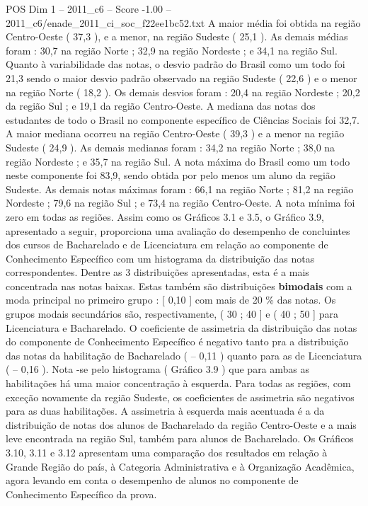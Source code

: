 \begin{textsample}{POS Dim 1 – 2011\_c6 – Score -1.00 – 2011\_c6/enade\_2011\_ci\_soc\_f22ee1bc52.txt}
A maior média foi obtida na região Centro-Oeste ( 37,3 ), e a menor, na região Sudeste ( 25,1 ).
As demais médias foram : 30,7 na região Norte ; 32,9 na região Nordeste ; e 34,1 na região Sul.
Quanto à variabilidade das notas, o desvio padrão do Brasil como um todo foi 21,3 sendo o maior desvio padrão observado na região Sudeste ( 22,6 ) e o menor na região Norte ( 18,2 ).
Os demais desvios foram : 20,4 na região Nordeste ; 20,2 da região Sul ; e 19,1 da região Centro-Oeste.
A mediana das notas dos estudantes de todo o Brasil no componente específico de Ciências Sociais foi 32,7.
A maior mediana ocorreu na região Centro-Oeste ( 39,3 ) e a menor na região Sudeste ( 24,9 ).
As demais medianas foram : 34,2 na região Norte ; 38,0 na região Nordeste ; e 35,7 na região Sul.
A nota máxima do Brasil como um todo neste componente foi 83,9, sendo obtida por pelo menos um aluno da região Sudeste.
As demais notas máximas foram : 66,1 na região Norte ; 81,2 na região Nordeste ; 79,6 na região Sul ; e 73,4 na região Centro-Oeste.
A nota mínima foi zero em todas as regiões.
Assim como os Gráficos 3.1 e 3.5, o Gráfico 3.9, apresentado a seguir, proporciona uma avaliação do desempenho de concluintes dos cursos de Bacharelado e de Licenciatura em relação ao componente de Conhecimento Específico com um histograma da distribuição das notas correspondentes.
Dentre as 3 distribuições apresentadas, esta é a mais concentrada nas notas baixas.
Estas também são distribuições \textbf{bimodais} com a moda principal no primeiro grupo : [ 0,10 ] com mais de 20 \% das notas.
Os grupos modais secundários são, respectivamente, ( 30 ; 40 ] e ( 40 ; 50 ] para Licenciatura e Bacharelado.
O coeficiente de assimetria da distribuição das notas do componente de Conhecimento Específico é negativo tanto pra a distribuição das notas da habilitação de Bacharelado ( – 0,11 ) quanto para as de Licenciatura ( – 0,16 ).
Nota -se pelo histograma ( Gráfico 3.9 ) que para ambas as habilitações há uma maior concentração à esquerda.
Para todas as regiões, com exceção novamente da região Sudeste, os coeficientes de assimetria são negativos para as duas habilitações.
A assimetria à esquerda mais acentuada é a da distribuição de notas dos alunos de Bacharelado da região Centro-Oeste e a mais leve encontrada na região Sul, também para alunos de Bacharelado.
Os Gráficos 3.10, 3.11 e 3.12 apresentam uma comparação dos resultados em relação à Grande Região do país, à Categoria Administrativa e à Organização Acadêmica, agora levando em conta o desempenho de alunos no componente de Conhecimento Específico da prova.

\end{textsample}
